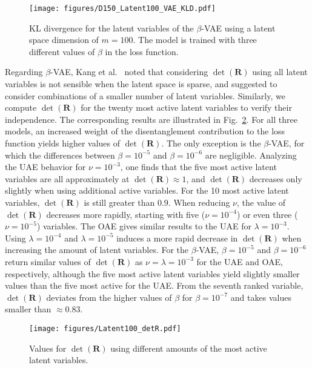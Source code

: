 \begin{figure}[h!]
    \centering
    \texttt{[image: figures/D150\_Latent100\_VAE\_KLD.pdf]}
    \caption{KL divergence for the latent variables of the $\beta$-VAE using a latent space dimension of $m=100$. The model is trained with
    three different values of $\beta$ in the loss function.}
    \label{fig:D150_Latent100_vae_KLD}
\end{figure}
  
Regarding $\beta$-VAE, Kang et al.~\cite{kang:2022} noted that considering $\det(\mathbf{R})$ using all latent variables is not sensible when the latent space is sparse, and suggested to consider combinations of a smaller number of latent variables. 
Similarly, we compute $\det(\mathbf{R})$ for the twenty most active latent variables to verify their independence. The corresponding results are illustrated in Fig.~\ref{fig:D150_UAE_Latent100_detR}. For all three models, an increased weight of the disentanglement contribution to the loss function yields higher values of $\det(\mathbf{R})$. The only exception is the $\beta$-VAE, for which the differences between $\beta=10^{-5}$ and $\beta=10^{-6}$ are negligible. Analyzing the UAE behavior for $\nu=10^{-3}$, one finds that the five most active latent variables are all approximately at $\det(\mathbf{R})\approx 1$, and $\det(\mathbf{R})$ decreases only slightly when using additional active variables.
For the 10 most active latent variables, $\det(\mathbf{R})$ is still greater than $0.9$. When reducing $\nu$, the value of $\det(\mathbf{R})$ decreases more rapidly, starting with five ($\nu=10^{-4}$) or even three ($\nu=10^{-5}$) variables.
The OAE gives similar results to the UAE for $\lambda=10^{-3}$. Using $\lambda=10^{-4}$ and $\lambda=10^{-5}$ induces a more rapid decrease in $\det(\mathbf{R})$ when increasing the amount of latent variables. 
For the $\beta$-VAE, $\beta=10^{-5}$ and $\beta=10^{-6}$ return similar values of $\det(\mathbf{R})$ as $\nu=\lambda=10^{-3}$ for the UAE and OAE, respectively, although the five most active latent variables yield slightly smaller values than the five most active for the UAE. From the seventh ranked variable, $\det(\mathbf{R})$ deviates from the higher values of $\beta$ for $\beta=10^{-7}$ and takes values smaller than $\approx0.83$.




\begin{figure}[h!]
    \centering
    \texttt{[image: figures/Latent100\_detR.pdf]}
    \caption{Values for $\det(\mathbf{R})$ using different amounts of the most active latent variables.}
    \label{fig:D150_UAE_Latent100_detR}
\end{figure}


